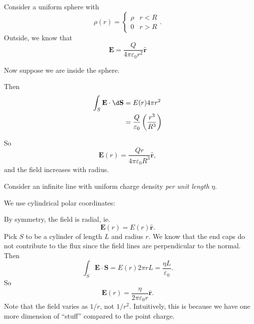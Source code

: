 \documentclass[a4paper]{article}
\begin{document}
\begin{eg}
  Consider a uniform sphere with
  \[
    \rho (r) = \begin{cases}
      \rho & r < R\\
      0 & r > R
    \end{cases}.
  \]
  Outside, we know that 
  \[
    \mathbf{E} = \frac{Q}{4\pi\varepsilon_0 r^2}\hat{\mathbf{r}}
  \]

  Now suppose we are inside the sphere.
   \begin{center}
  \end{center}

  Then
  \begin{align*}
    \int_S \mathbf{E}\cdot \d\mathbf{S} &= E(r) 4\pi r^2\\
    &= \frac{Q}{\varepsilon_0}\left(\frac{r^3}{R^3}\right)
  \end{align*}
  
  So 
  \[
    \mathbf{E}(r) = \frac{Qr}{4\pi\varepsilon_0 R^3}\hat{\mathbf{r}},
  \]
  and the field increases with radius. 
\end{eg}

\begin{eg}
  Consider an infinite line with uniform charge density \emph{per unit length} $\eta$.

  We use cylindrical polar coordinates:
  \begin{center}
  \end{center}

  By symmetry, the field is radial, ie.
  \[
    \mathbf{E}(r) = E(r) \hat{\mathbf{r}}.
  \]
  Pick $S$ to be a cylinder of length $L$ and radius $r$. We know that the end caps do not contribute to the flux since the field lines are perpendicular to the normal. Then
  \[
    \int_S\mathbf{E}\cdot \mathbf{S} = E(r)2\pi rL = \frac{\eta L}{\varepsilon_0}.
  \]
  So
  \[
    \mathbf{E}(r) = \frac{\eta}{2\pi \varepsilon_0 r} \hat{\mathbf{r}}.
  \]
  Note that the field varies as $1/r$, not $1/r^2$. Intuitively, this is because we have one more dimension of ``stuff'' compared to the point charge. 
\end{eg}
\end{document}

